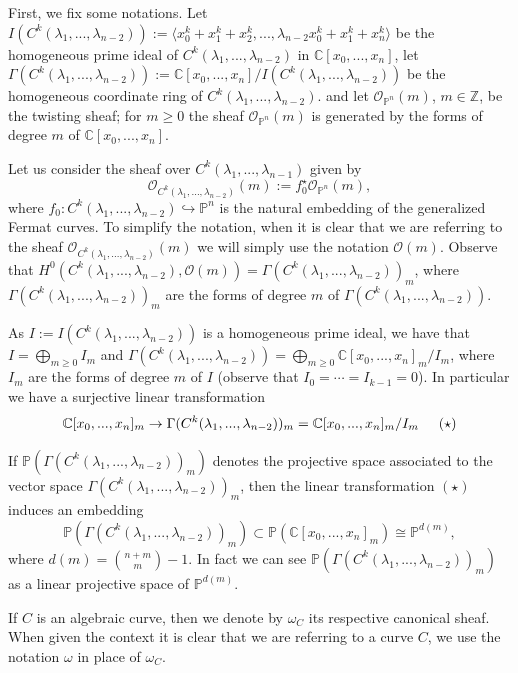\documentclass{amsart}
\newcommand{\C}[3]{\ensuremath{C^{#1}(#3_1,...,#3_{#2})}}
\begin{document}
First, we fix some notations.
Let $I(\C{k}{n-2}{\lambda}):=\langle x_0^k+x_1^k+x_2^k,...,\lambda_{n-2}x_0^k+x_1^k+x_{n}^k\rangle$
be the homogeneous prime ideal 
of  $\C{k}{n-2}{\lambda}$ in ${\mathbb{C}}[x_0,...,x_n]$, let $\Gamma(\C{k}{n-2}{\lambda}):={\mathbb{C}}[x_0,...,x_n]/I(\C{k}{n-2}{\lambda})$ be the homogeneous coordinate ring of $\C{k}{n-2}{\lambda}$. and let $\mathcal{O}_{{\mathbb{P}}^n}(m)$, $m\in {\mathbb{Z}}$, be the twisting sheaf; for $m\geq 0$ the sheaf  $\mathcal{O}_{{\mathbb{P}}^n}(m)$ is generated by the forms  of degree $m$ of ${\mathbb{C}}[x_0,...,x_n]$.

Let us consider the  sheaf over $\C{k}{n-1}{\lambda}$ given by
$$\mathcal{O}_{\C{k}{n-2}{\lambda}}(m):=f_0^{\star}\mathcal{O}_{{\mathbb{P}}^n}(m),$$
where $f_0:\C{k}{n-2}{\lambda}\hookrightarrow {\mathbb{P}}^n$ is the natural embedding of the generalized Fermat curves.
To simplify the notation, when it is clear that we are referring to the sheaf $\mathcal{O}_{\C{k}{n-2}{\lambda}}(m)$  we will simply use the notation
$\mathcal{O}(m)$.  Observe that $H^{0}(\C{k}{n-2}{\lambda},\mathcal{O}(m))=\Gamma(\C{k}{n-2}{\lambda})_m$,
where  $\Gamma(\C{k}{n-2}{\lambda})_m$ are the forms of degree  $m$ of $\Gamma(\C{k}{n-2}{\lambda})$.


As  $I:=I(\C{k}{n-2}{\lambda})$ is a homogeneous prime ideal, we have that 
 $I=\bigoplus_{m\geq 0}I_m$ and $\Gamma(\C{k}{n-2}{\lambda})= \bigoplus_{m\geq 0}\mathbb{C}[x_0,...,x_n]_m/I_m$,
where $I_m$ are the forms of degree $m$ of $I$ (observe that $I_0=\cdots =I_{k-1}=0$). 
In particular we have a surjective linear transformation 
$${\mathbb{C}}[x_0,...,x_n]_m\rightarrow \Gamma(\C{k}{n-2}{\lambda})_m=
 \mathbb{C}[x_0,...,x_n]_m/I_m  \hspace{0.5cm} (\star) $$

 
If ${\mathbb{P}}(\Gamma(\C{k}{n-2}{\lambda})_m)$ denotes the projective space associated to the vector
space $\Gamma(\C{k}{n-2}{\lambda})_m$, then the  linear transformation $(\star)$  induces an embedding
$${\mathbb{P}}(\Gamma(\C{k}{n-2}{\lambda})_m)\subset {\mathbb{P}}({\mathbb{C}}[x_0,...,x_n]_m)\cong {\mathbb{P}}^{d(m)},$$ 
where $d(m)=\binom{n+m}{m}-1$. In fact we can see $\mathbb{P}(\Gamma(\C{k}{n-2}{\lambda})_m)$
as a linear projective space of ${\mathbb{P}}^{d(m)}$.

 
If $C$ is an algebraic curve, then we denote by $\omega_C$ its respective canonical sheaf. 
When given the context it is clear that we are referring to a curve $C$, we use the notation $\omega$ in place of $\omega_C$. 
\end{document}
